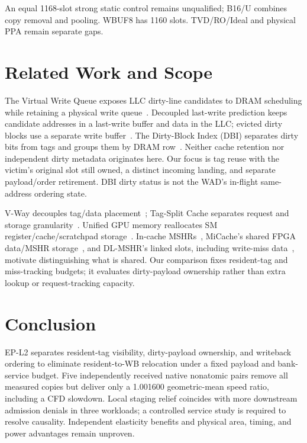 \documentclass[conference,letterpaper]{IEEEtran}
\newcommand{\epl}{EP-L2}
\begin{document}
An equal 1168-slot strong static control remains unqualified; B16/U combines copy removal and pooling. WBUF8 has 1160 slots. TVD/RO/Ideal and physical PPA remain separate gaps.

\section{Related Work and Scope}
The Virtual Write Queue exposes LLC dirty-line candidates to DRAM scheduling while retaining a physical write queue~\cite{vwq}. Decoupled last-write prediction keeps candidate addresses in a last-write buffer and data in the LLC; evicted dirty blocks use a separate write buffer~\cite{lastwrite}. The Dirty-Block Index (DBI) separates dirty bits from tags and groups them by DRAM row~\cite{dbi}. Neither cache retention nor independent dirty metadata originates here. Our focus is tag reuse with the victim's original slot still owned, a distinct incoming landing, and separate payload/order retirement. DBI dirty status is not the WAD's in-flight same-address ordering state.

V-Way decouples tag/data placement~\cite{vway}; Tag-Split Cache separates request and storage granularity~\cite{tsc}. Unified GPU memory reallocates SM register/cache/scratchpad storage~\cite{unified}. In-cache MSHRs~\cite{farkas}, MiCache's shared FPGA data/MSHR storage~\cite{micache}, and DL-MSHR's linked slots, including write-miss data~\cite{dlmshr}, motivate distinguishing what is shared. Our comparison fixes resident-tag and miss-tracking budgets; it evaluates dirty-payload ownership rather than extra lookup or request-tracking capacity.

\section{Conclusion}
\epl{} separates resident-tag visibility, dirty-payload ownership, and writeback ordering to eliminate resident-to-WB relocation under a fixed payload and bank-service budget. Five independently received native nonatomic pairs remove all measured copies but deliver only a 1.001600 geometric-mean speed ratio, including a CFD slowdown. Local staging relief coincides with more downstream admission denials in three workloads; a controlled service study is required to resolve causality. Independent elasticity benefits and physical area, timing, and power advantages remain unproven.

\clearpage


\end{document}
